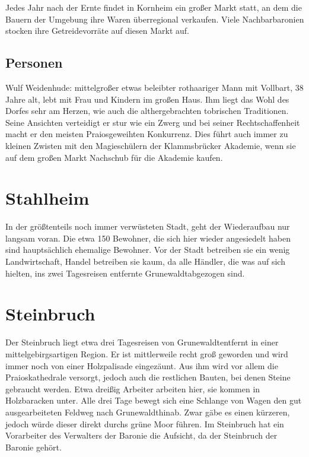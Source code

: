 Jedes Jahr nach der Ernte findet in Kornheim ein großer Markt statt, an dem die Bauern der Umgebung ihre Waren überregional verkaufen. Viele Nachbarbaronien stocken ihre Getreidevorräte auf diesen Markt auf.

\subsection{Personen}
Wulf Weidenhude: mittelgroßer etwas beleibter rothaariger Mann mit Vollbart, 38 Jahre alt, lebt mit Frau und Kindern im großen Haus. Ihm liegt das Wohl des Dorfes sehr am Herzen, wie auch die althergebrachten tobrischen Traditionen. Seine Ansichten verteidigt er stur wie ein Zwerg und bei seiner Rechtschaffenheit macht er den meisten Praiosgeweihten Konkurrenz. Dies führt auch immer zu kleinen Zwisten mit den Magieschülern der Klammsbrücker Akademie, wenn sie auf dem großen Markt Nachschub für die Akademie kaufen.

\section{Stahlheim}
In der größtenteils noch immer verwüsteten Stadt, geht der Wiederaufbau nur langsam voran. Die etwa 150 Bewohner, die sich hier wieder angesiedelt haben sind hauptsächlich ehemalige Bewohner. Vor der Stadt betreiben sie ein wenig Landwirtschaft, Handel betreiben sie kaum, da alle Händler, die was auf sich hielten, ins zwei Tagesreisen entfernte Grunewaldtabgezogen sind.

\section{Steinbruch}
Der Steinbruch liegt etwa drei Tagesreisen von Grunewaldtentfernt in einer mittelgebirgsartigen Region. Er ist mittlerweile recht groß geworden und wird immer noch von einer Holzpalisade eingezäunt. Aus ihm wird vor allem die Praioskathedrale versorgt, jedoch auch die restlichen Bauten, bei denen Steine gebraucht werden. Etwa dreißig Arbeiter arbeiten hier, sie kommen in Holzbaracken unter. Alle drei Tage bewegt sich eine Schlange von Wagen den gut ausgearbeiteten Feldweg nach Grunewaldthinab. Zwar gäbe es einen kürzeren, jedoch würde dieser direkt durchs grüne Moor führen. Im Steinbruch hat ein Vorarbeiter des Verwalters der Baronie die Aufsicht, da der Steinbruch der Baronie gehört.

